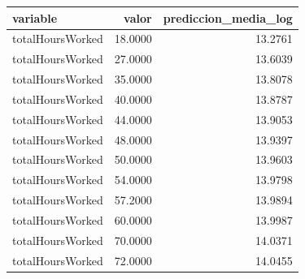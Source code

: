 \begin{tabular}{lrr}
\toprule
variable & valor & prediccion\_media\_log \\
\midrule
totalHoursWorked & 18.0000 & 13.2761 \\
totalHoursWorked & 27.0000 & 13.6039 \\
totalHoursWorked & 35.0000 & 13.8078 \\
totalHoursWorked & 40.0000 & 13.8787 \\
totalHoursWorked & 44.0000 & 13.9053 \\
totalHoursWorked & 48.0000 & 13.9397 \\
totalHoursWorked & 50.0000 & 13.9603 \\
totalHoursWorked & 54.0000 & 13.9798 \\
totalHoursWorked & 57.2000 & 13.9894 \\
totalHoursWorked & 60.0000 & 13.9987 \\
totalHoursWorked & 70.0000 & 14.0371 \\
totalHoursWorked & 72.0000 & 14.0455 \\
\bottomrule
\end{tabular}
